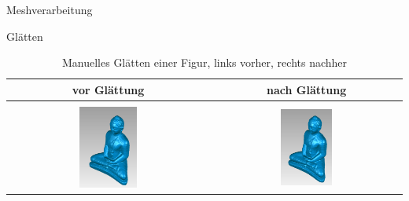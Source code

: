 \documentclass[11pt]{beamer}
\begin{document}
\begin{frame}{Meshverarbeitung}

\begin{block}{Glätten}
\begin{table}[h]
	\begin{center}
		\begin{tabular}{| c | c |}
			\hline
			vor Glättung & nach Glättung \\
			\hline
			\hline
			& \\
			\includegraphics[width=0.30\textwidth]{./Images/GeomagicBudhaPictures/Budha_Presmooth.PNG} & \includegraphics[width=0.285\textwidth]{./Images/GeomagicBudhaPictures/Budha_Postsmooth.PNG} \\
			\hline					  
		\end{tabular}
	\end{center}
	\caption{Manuelles Glätten einer Figur, links vorher, rechts nachher}
	\label{tab:BudhaSmooth}
\end{table}
\end{block}

\end{frame}
\end{document}

